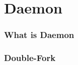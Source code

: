 \section{Daemon}

\begin{frame}
    \frametitle{What is Daemon}


\end{frame}

\begin{frame}
    \frametitle{Double-Fork}



\end{frame}
